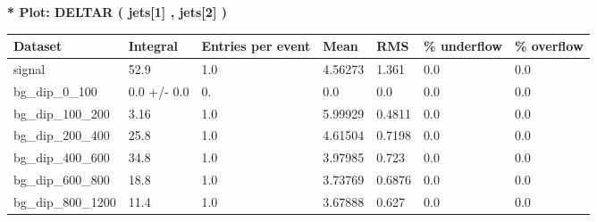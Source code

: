 \documentclass[a4paper, 10pt]{article}
\begin{document}
\textbf{* Plot: DELTAR ( jets[1] , jets[2] ) }\\
   \begin{table}[H]
  \begin{center}
    \begin{tabular}{|m{23.0mm}|m{23.0mm}|m{18.0mm}|m{19.0mm}|m{19.0mm}|m{19.0mm}|m{19.0mm}|}
      \hline
      {\cellcolor{yellow}         Dataset}& {\cellcolor{yellow}         Integral}& {\cellcolor{yellow}         Entries per event}& {\cellcolor{yellow}         Mean}& {\cellcolor{yellow}         RMS}& {\cellcolor{yellow}         \% underflow}& {\cellcolor{yellow}         \% overflow}\\
      \hline
      {\cellcolor{white}         signal}& {\cellcolor{white}         52.9}& {\cellcolor{white}         1.0}& {\cellcolor{white}         4.56273}& {\cellcolor{white}         1.361}& {\cellcolor{green}         0.0}& {\cellcolor{green}         0.0}\\
      \hline
      {\cellcolor{white}         bg\_dip\_0\_100}& {\cellcolor{white}         0.0 +/\-- 0.0}& {\cellcolor{white}         0.}& {\cellcolor{white}         0.0}& {\cellcolor{white}         0.0}& {\cellcolor{green}         0.0}& {\cellcolor{green}         0.0}\\
      \hline
      {\cellcolor{white}         bg\_dip\_100\_200}& {\cellcolor{white}         3.16}& {\cellcolor{white}         1.0}& {\cellcolor{white}         5.99929}& {\cellcolor{white}         0.4811}& {\cellcolor{green}         0.0}& {\cellcolor{green}         0.0}\\
      \hline
      {\cellcolor{white}         bg\_dip\_200\_400}& {\cellcolor{white}         25.8}& {\cellcolor{white}         1.0}& {\cellcolor{white}         4.61504}& {\cellcolor{white}         0.7198}& {\cellcolor{green}         0.0}& {\cellcolor{green}         0.0}\\
      \hline
      {\cellcolor{white}         bg\_dip\_400\_600}& {\cellcolor{white}         34.8}& {\cellcolor{white}         1.0}& {\cellcolor{white}         3.97985}& {\cellcolor{white}         0.723}& {\cellcolor{green}         0.0}& {\cellcolor{green}         0.0}\\
      \hline
      {\cellcolor{white}         bg\_dip\_600\_800}& {\cellcolor{white}         18.8}& {\cellcolor{white}         1.0}& {\cellcolor{white}         3.73769}& {\cellcolor{white}         0.6876}& {\cellcolor{green}         0.0}& {\cellcolor{green}         0.0}\\
      \hline
      {\cellcolor{white}         bg\_dip\_800\_1200}& {\cellcolor{white}         11.4}& {\cellcolor{white}         1.0}& {\cellcolor{white}         3.67888}& {\cellcolor{white}         0.627}& {\cellcolor{green}         0.0}& {\cellcolor{green}         0.0}\\

\end{tabular}
\end{center}
\end{table}
\end{document}
